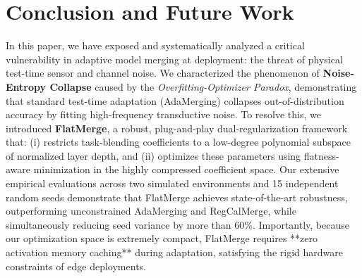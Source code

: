 \section{Conclusion and Future Work}
\label{sec:conclusion}

In this paper, we have exposed and systematically analyzed a critical vulnerability in adaptive model merging at deployment: the threat of physical test-time sensor and channel noise. 
We characterized the phenomenon of \textbf{Noise-Entropy Collapse} caused by the \emph{Overfitting-Optimizer Paradox}, demonstrating that standard test-time adaptation (AdaMerging) collapses out-of-distribution accuracy by fitting high-frequency transductive noise. 
To resolve this, we introduced \textbf{FlatMerge}, a robust, plug-and-play dual-regularization framework that: (i) restricts task-blending coefficients to a low-degree polynomial subspace of normalized layer depth, and (ii) optimizes these parameters using flatness-aware minimization in the highly compressed coefficient space. 
Our extensive empirical evaluations across two simulated environments and 15 independent random seeds demonstrate that FlatMerge achieves state-of-the-art robustness, outperforming unconstrained AdaMerging and RegCalMerge, while simultaneously reducing seed variance by more than $60\%$. 
Importantly, because our optimization space is extremely compact, FlatMerge requires **zero activation memory caching** during adaptation, satisfying the rigid hardware constraints of edge deployments.

